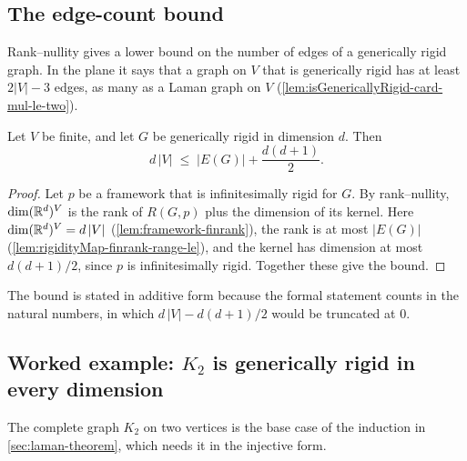 \subsection{The edge-count bound}

Rank--nullity gives a lower bound on the number of edges of a
generically rigid graph. In the plane it says that a graph on $V$ that
is generically rigid has at least $2|V| - 3$ edges, as many as a Laman
graph on $V$ (\cref{lem:isGenericallyRigid-card-mul-le-two}).

\begin{theorem}
  \label{thm:isGenericallyRigid-card-mul-le}
  \leanok
  Let $V$ be finite, and let $G$ be generically rigid in dimension $d$.
  Then
  \[
    d\,|V| \;\le\; |E(G)| + \frac{d(d+1)}{2}.
  \]
\end{theorem}
\begin{proof}
  \leanok
  Let $p$ be a framework that is infinitesimally rigid for $G$. By
  rank--nullity, $\dim ({\mathbb{R}}^{d})^{V}$ is the rank of $R(G, p)$ plus the
  dimension of its kernel. Here $\dim ({\mathbb{R}}^{d})^{V} = d\,|V|$
  (\cref{lem:framework-finrank}), the rank is at most $|E(G)|$
  (\cref{lem:rigidityMap-finrank-range-le}), and the kernel has
  dimension at most $d(d+1)/2$, since $p$ is infinitesimally rigid.
  Together these give the bound.
\end{proof}
\begin{fmlnote}
  The bound is stated in additive form because the formal statement
  counts in the natural numbers, in which $d\,|V| - d(d+1)/2$ would be
  truncated at $0$.
\end{fmlnote}

\subsection{Worked example: \texorpdfstring{$K_2$}{K2} is generically rigid in every dimension}

The complete graph $K_2$ on two vertices is the base case of the
induction in \cref{sec:laman-theorem}, which needs it in the injective
form.

